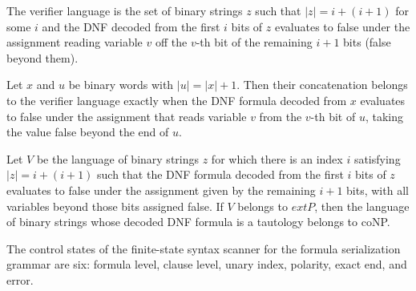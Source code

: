 \begin{definition}
\label{Complexity.tautVerifier}
\leanok
{}
The verifier language is the set of binary strings $z$ such that $|z| = i + (i + 1)$
for some $i$ and the DNF decoded from the first $i$ bits of $z$ evaluates to false
under the assignment reading variable $v$ off the $v$-th bit of the remaining $i + 1$
bits (false beyond them).
\end{definition}

\begin{lemma}
\label{Complexity.taut_verifier_append}
\leanok
{}
Let $x$ and $u$ be binary words with $|u|=|x|+1$. Then their concatenation belongs to
the verifier language exactly when the DNF formula decoded from $x$ evaluates to false
under the assignment that reads variable $v$ from the $v$-th bit of $u$, taking the
value false beyond the end of $u$.
\end{lemma}

\begin{lemma}
\label{Complexity.taut_membership_of_verifier}
\leanok
{}
Let $V$ be the language of binary strings $z$ for which there is an index $i$ satisfying
$|z|=i+(i+1)$ such that the DNF formula decoded from the first $i$ bits of $z$ evaluates
to false under the assignment given by the remaining $i+1$ bits, with all variables
beyond those bits assigned false. If $V$ belongs to $	ext{P}$, then the language of
binary strings whose decoded DNF formula is a tautology belongs to coNP.
\end{lemma}

\begin{definition}
\label{Complexity.TautSyntax}
\leanok
The control states of the finite-state syntax scanner for the formula serialization
grammar are six: formula level, clause level, unary index, polarity, exact end, and
error.
\end{definition}

